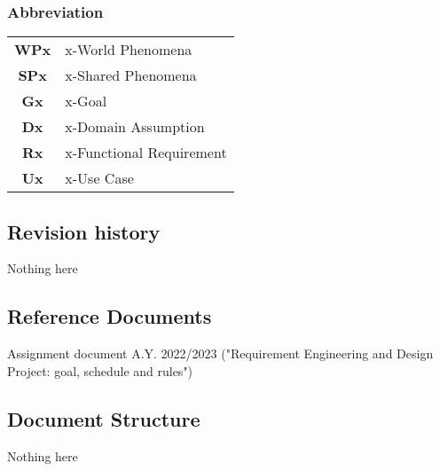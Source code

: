 \subsubsection{Abbreviation}
\begin{table}[H]
    \begin{tabularx}{\textwidth}{cX}
        \toprule
        \textbf{WPx} & x-World Phenomena        \\
        \textbf{SPx} & x-Shared Phenomena       \\
        \textbf{Gx}  & x-Goal                   \\
        \textbf{Dx}  & x-Domain Assumption      \\
        \textbf{Rx}  & x-Functional Requirement \\
        \textbf{Ux}  & x-Use Case               \\ \bottomrule
    \end{tabularx}
\end{table}

\subsection{Revision history}
Nothing here

\subsection{Reference Documents}
Assignment document A.Y. 2022/2023 ("Requirement Engineering and Design Project: goal, schedule and rules")


\subsection{Document Structure}
Nothing here
